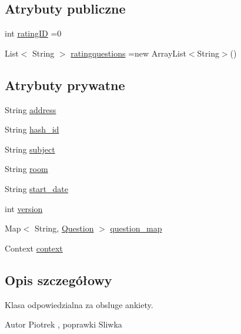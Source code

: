 \subsection*{Atrybuty publiczne}
\begin{DoxyCompactItemize}
\item 
int \hyperlink{classcom_1_1example_1_1qrpoll_1_1_poll_a41aee71def14cf65836f768222a32ba3}{rating\+I\+D} =0
\item 
List$<$ String $>$ \hyperlink{classcom_1_1example_1_1qrpoll_1_1_poll_a357dc2acb9f42f2bee8dd88556551637}{ratingquestions} =new Array\+List$<$String$>$()
\end{DoxyCompactItemize}
\subsection*{Atrybuty prywatne}
\begin{DoxyCompactItemize}
\item 
String \hyperlink{classcom_1_1example_1_1qrpoll_1_1_poll_a284d664b1db022d0fe8f089c4cad5ead}{address}
\item 
String \hyperlink{classcom_1_1example_1_1qrpoll_1_1_poll_acbb2a9859e39f1b1ce48e75c95eb3866}{hash\+\_\+id}
\item 
String \hyperlink{classcom_1_1example_1_1qrpoll_1_1_poll_ac710a3059ee7152dd6aa5e7bea399726}{subject}
\item 
String \hyperlink{classcom_1_1example_1_1qrpoll_1_1_poll_a73035d1fde89a6b4d69cd4e5ee610b8b}{room}
\item 
String \hyperlink{classcom_1_1example_1_1qrpoll_1_1_poll_a43059ae0d84924af4a6f876f31ee26d4}{start\+\_\+date}
\item 
int \hyperlink{classcom_1_1example_1_1qrpoll_1_1_poll_af8617455744b1f5935c9c4042345782c}{version}
\item 
Map$<$ String, \hyperlink{classcom_1_1example_1_1qrpoll_1_1_question}{Question} $>$ \hyperlink{classcom_1_1example_1_1qrpoll_1_1_poll_ac4019650bac8ecbf279808dc4d4dae9b}{question\+\_\+map}
\item 
Context \hyperlink{classcom_1_1example_1_1qrpoll_1_1_poll_a22159bb6ccaf5330c7691c47fcb0ea00}{context}
\end{DoxyCompactItemize}


\subsection{Opis szczegółowy}
Klasa odpowiedzialna za obsluge ankiety.

\begin{DoxyAuthor}{Autor}
Piotrek , poprawki Sliwka 
\end{DoxyAuthor}


